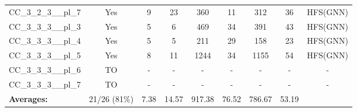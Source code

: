 \documentclass{article}
\begin{document}
\begin{tabular}{lcccccccc}
CC\_3\_2\_3\_\_pl\_7 & Yes & 9 & 23 & 360 & 11 & 312 & 36 & HFS(GNN) \\
CC\_3\_3\_3\_\_pl\_3 & Yes & 5 & 6 & 469 & 34 & 391 & 43 & HFS(GNN) \\
CC\_3\_3\_3\_\_pl\_4 & Yes & 5 & 5 & 211 & 29 & 158 & 23 & HFS(GNN) \\
CC\_3\_3\_3\_\_pl\_5 & Yes & 8 & 11 & 1244 & 34 & 1155 & 54 & HFS(GNN) \\
CC\_3\_3\_3\_\_pl\_6 & TO & - & - & - & - & - & - & - \\
CC\_3\_3\_3\_\_pl\_7 & TO & - & - & - & - & - & - & - \\
\textbf{Averages:} & 21/26 (81\%) & 7.38 & 14.57 & 917.38 & 76.52 & 786.67 & 53.19 & \\
\bottomrule
\end{tabular}
\\[0.7cm]
\end{document}
